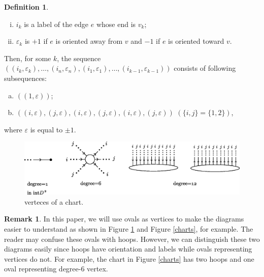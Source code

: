 \documentclass{amsart}
\theoremstyle{plain}
\theoremstyle{definition}
\newtheorem{defn}[thm]{Definition}
\newtheorem{rem}[thm]{Remark}
\begin{document}
\begin{defn}
\begin{enumerate}[(1)]
\begin{enumerate}[(i)]
\setlength{\itemindent}{8pt}
\item $i_k$ is a label of the edge $e$ whose end is $v_k$; 

\item $\varepsilon_k$ is $+1$ if $e$ is oriented away from $v$ and $-1$ if $e$ is oriented toward $v$. 
\end{enumerate}
\noindent
Then, for some $k$, the sequence $((i_k,\varepsilon_k),\ldots,(i_n,\varepsilon_n),(i_1,\varepsilon_1),\ldots,(i_{k-1},\varepsilon_{k-1}))$ consists of following subsequences: 

\begin{enumerate}[(a)]
\setlength{\itemindent}{14pt}
\item $((1,\varepsilon))$; 

\item $((i,\varepsilon),(j,\varepsilon),(i,\varepsilon),(j,\varepsilon),(i,\varepsilon),(j,\varepsilon))$  $(\{i,j\}=\{1,2\})$, 

\end{enumerate}
where $\varepsilon$ is equal to $\pm 1$. 

\end{enumerate}

\begin{figure}[htbp]
\begin{center}
\includegraphics[width=140mm]{vertex.eps}
\end{center}
\caption{verteces of a chart.}
\label{vertex}
\end{figure}

\end{defn}

\begin{rem}

In this paper, we will use ovals as vertices to make the diagrams easier to understand as shown in Figure \ref{vertex} and Figure \ref{charts}, for example. 
The reader may confuse these ovals with hoops. 
However, we can distinguish these two diagrams easily since hoops have orientation and labels while ovals representing vertices do not. 
For example, the chart in Figure \ref{charts} has two hoops and one oval representing degree-$6$ vertex. 

\end{rem}
\end{document}
